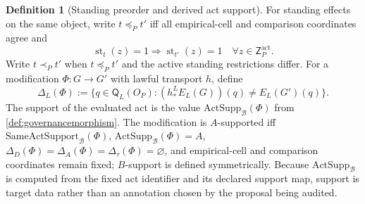 \documentclass[11pt]{article}
\theoremstyle{definition}
\newtheorem{definition}[theorem]{Definition}
\newcommand{\Bell}{\mathcal{B}}
\newcommand{\Active}{\mathrm{act}}
\newcommand{\ActSupp}{\mathrm{ActSupp}_{\Bell}}
\newcommand{\SameActSupp}{\mathrm{SameActSupport}_{\Bell}}
\begin{document}
\begin{definition}[Standing preorder and derived act support]\label{def:standingpreorder}
For standing effects on the same object, write $t\preceq_Pt'$ iff all empirical-cell and comparison coordinates agree and
\[
\operatorname{st}_t(z)=1\Longrightarrow\operatorname{st}_{t'}(z)=1
\quad\forall z\in\mathsf Z_P^{\Active}.
\]
Write $t\prec_Pt'$ when $t\preceq_Pt'$ and the active standing restrictions differ. For a modification $\Phi:G\to G'$ with lawful transport $h$, define
\[
\Delta_L(\Phi):=\{q\in\mathsf Q_L(O_P):(h_*^LE_L(G))(q)\neq E_L(G')(q)\}.
\]
The support of the evaluated act is the value $\ActSupp(\Phi)$ from \cref{def:governancemorphism}. The modification is $A$-supported iff $\SameActSupp(\Phi)$, $\ActSupp(\Phi)=A$, $\Delta_D(\Phi)=\Delta_A(\Phi)=\Delta_{\tau}(\Phi)=\varnothing$, and empirical-cell and comparison coordinates remain fixed; $B$-support is defined symmetrically. Because $\ActSupp$ is computed from the fixed act identifier and its declared support map, support is target data rather than an annotation chosen by the proposal being audited.
\end{definition}
\end{document}
